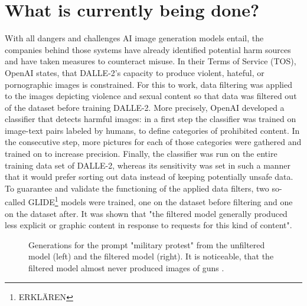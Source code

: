 \documentclass[10pt,twocolumn,twoside]{osajnl}
\begin{document}
\section{What is currently being done?}
\label{section:6}
With all dangers and challenges AI image generation models entail, the companies behind those systems have already identified potential harm sources and have taken measures to counteract misuse.
In their Terms of Service (TOS), OpenAI states, that DALLE-2's capacity to produce violent, hateful, or pornographic images is constrained. 
For this to work, data filtering was applied to the images depicting violence and sexual content so that data was filtered out of the dataset before training DALLE-2.
More precisely, OpenAI developed a classifier that detects harmful images: in a first step the classifier was trained on image-text pairs labeled by humans, to define categories 
of prohibited content. In the consecutive step, more pictures for each of those categories were gathered and trained on to increase precision. Finally, the classifier was run on the entire 
training data set of DALLE-2, whereas its sensitivity was set in such a manner that it would prefer sorting out data instead of keeping potentially unsafe data. 
To guarantee and validate the functioning of the applied data filters, two so-called GLIDE\footnote[5]{ERKLÄREN} models were trained, one on the dataset before filtering and one on the dataset after.
It was shown that "the filtered model generally produced less explicit or graphic content in response to requests for this kind of content"\cite{openaifilters}. 
\begin{figure}[htbp]
	\centering
	\caption{Generations for the prompt "military protest" from the unfiltered model (left) and the filtered model (right). 
	It is noticeable, that the filtered model almost never produced images of guns \cite{openaifilters}.}
	\label{filters}
\end{figure}
\end{document}

